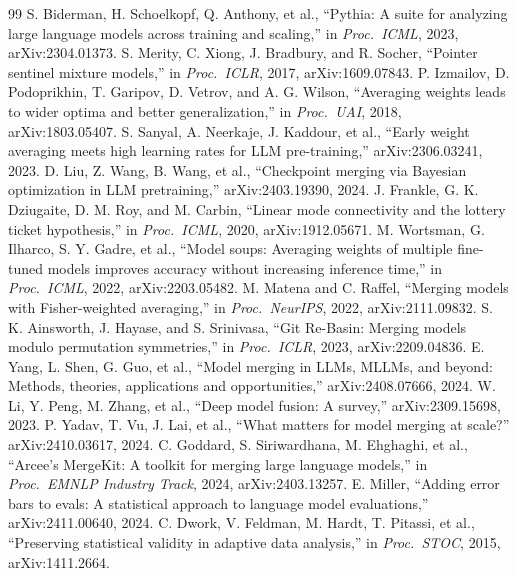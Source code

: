 \documentclass[conference]{IEEEtran}
\begin{document}
\begin{thebibliography}{99}
 S. Biderman, H. Schoelkopf, Q. Anthony, et al., ``Pythia: A suite for analyzing large language models across training and scaling,'' in \emph{Proc.\ ICML}, 2023, arXiv:2304.01373.
 S. Merity, C. Xiong, J. Bradbury, and R. Socher, ``Pointer sentinel mixture models,'' in \emph{Proc.\ ICLR}, 2017, arXiv:1609.07843.
 P. Izmailov, D. Podoprikhin, T. Garipov, D. Vetrov, and A. G. Wilson, ``Averaging weights leads to wider optima and better generalization,'' in \emph{Proc.\ UAI}, 2018, arXiv:1803.05407.
 S. Sanyal, A. Neerkaje, J. Kaddour, et al., ``Early weight averaging meets high learning rates for LLM pre-training,'' arXiv:2306.03241, 2023.
 D. Liu, Z. Wang, B. Wang, et al., ``Checkpoint merging via Bayesian optimization in LLM pretraining,'' arXiv:2403.19390, 2024.
 J. Frankle, G. K. Dziugaite, D. M. Roy, and M. Carbin, ``Linear mode connectivity and the lottery ticket hypothesis,'' in \emph{Proc.\ ICML}, 2020, arXiv:1912.05671.
 M. Wortsman, G. Ilharco, S. Y. Gadre, et al., ``Model soups: Averaging weights of multiple fine-tuned models improves accuracy without increasing inference time,'' in \emph{Proc.\ ICML}, 2022, arXiv:2203.05482.
 M. Matena and C. Raffel, ``Merging models with Fisher-weighted averaging,'' in \emph{Proc.\ NeurIPS}, 2022, arXiv:2111.09832.
 S. K. Ainsworth, J. Hayase, and S. Srinivasa, ``Git Re-Basin: Merging models modulo permutation symmetries,'' in \emph{Proc.\ ICLR}, 2023, arXiv:2209.04836.
 E. Yang, L. Shen, G. Guo, et al., ``Model merging in LLMs, MLLMs, and beyond: Methods, theories, applications and opportunities,'' arXiv:2408.07666, 2024.
 W. Li, Y. Peng, M. Zhang, et al., ``Deep model fusion: A survey,'' arXiv:2309.15698, 2023.
 P. Yadav, T. Vu, J. Lai, et al., ``What matters for model merging at scale?'' arXiv:2410.03617, 2024.
 C. Goddard, S. Siriwardhana, M. Ehghaghi, et al., ``Arcee's MergeKit: A toolkit for merging large language models,'' in \emph{Proc.\ EMNLP Industry Track}, 2024, arXiv:2403.13257.
 E. Miller, ``Adding error bars to evals: A statistical approach to language model evaluations,'' arXiv:2411.00640, 2024.
 C. Dwork, V. Feldman, M. Hardt, T. Pitassi, et al., ``Preserving statistical validity in adaptive data analysis,'' in \emph{Proc.\ STOC}, 2015, arXiv:1411.2664.

\end{thebibliography}
\end{document}
